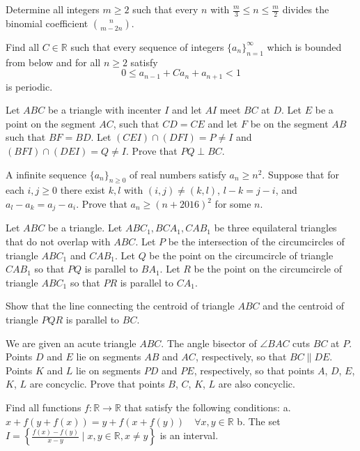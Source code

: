 \documentclass[11pt]{scrartcl}
\begin{document}
\begin{problem}[745968391440822]
Determine all integers $m \geq 2$ such that every $n$ with $\frac{m}{3} \leq n \leq \frac{m}{2}$ divides the binomial coefficient $\binom{n}{m-2n}$.
\end{problem}
\begin{problem}[746609563427040]
	Find all $C\in \mathbb{R}$ such that every sequence of integers $\{a_n\}_{n=1}^{\infty}$ which is bounded from below and for all $n\geq 2$ satisfy$$0\leq a_{n-1}+Ca_n+a_{n+1}<1$$is periodic.
\end{problem}
\begin{problem}[748238852463934]
	Let $ABC$ be a triangle with incenter $I$ and let $AI$ meet $BC$ at $D$. Let $E$ be a point on the segment $AC$, such that $CD=CE$ and let $F$ be on the segment $AB$ such that $BF=BD$. Let $(CEI) \cap (DFI)=P \neq I$ and $(BFI) \cap (DEI)=Q \neq I$. Prove that $PQ \perp BC$.
\end{problem}
\begin{problem}[748293992911976]
	A infinite sequence $\{ a_n \}_{n \ge 0}$ of real numbers satisfy $a_n \ge n^2$. Suppose that for each $i, j \ge 0$ there exist $k, l$ with $(i,j) \neq (k,l)$, $l - k = j - i$, and $a_l - a_k = a_j - a_i$. Prove that $a_n \ge (n + 2016)^2$ for some $n$.
\end{problem}
\begin{problem}[748616641641895]
Let $ABC$ be a triangle. Let $ABC_1, BCA_1, CAB_1$ be three equilateral triangles that do not overlap with $ABC$.
Let $P$ be the intersection of the circumcircles of triangle $ABC_1$ and $CAB_1$.
Let $Q$ be the point on the circumcircle of triangle $CAB_1$ so that $PQ$ is parallel to $BA_1$. Let $R$ be the point on the circumcircle of triangle $ABC_1$ so that $PR$ is parallel to $CA_1$.

Show that the line connecting the centroid of triangle $ABC$ and the centroid of triangle $PQR$ is parallel to $BC$.
\end{problem}
\begin{problem}[748681263295975]
We are given an acute triangle $ABC$. The angle bisector of $\angle BAC$ cuts $BC$ at $P$. Points $D$ and $E$ lie on segments $AB$ and $AC$, respectively, so that $BC \parallel  DE$. Points $K$ and $L$ lie on segments $PD$ and $PE$, respectively, so that points $A$, $D$, $E$, $K$, $L$ are concyclic. Prove that points $B$, $C$, $K$, $L$ are also concyclic.
\end{problem}
\begin{problem}[755843062311672]
	Find all functions $f:\mathbb{R}\rightarrow \mathbb{R}$ that satisfy the following conditions:
a. $x+f(y+f(x))=y+f(x+f(y)) \quad \forall x,y \in \mathbb{R}$
b. The set $I=\left\{\frac{f(x)-f(y)}{x-y}\mid x,y\in \mathbb{R},x\neq y \right\}$ is an interval.
\end{problem}
\end{document}
